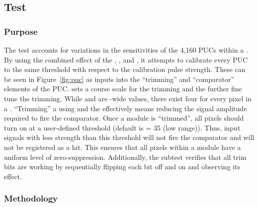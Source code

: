 
\newpage

\subsection{\trimming Test}
\label{ss:trimming}

\subsubsection{Purpose}

The \trimming test accounts for variations in the sensitivities of the 4,160 PUCs within a \roc.
By using the combined effect of the \vthrcomp, \vtrim, and \trimbits,
it attempts to calibrate every PUC to the same threshold with respect to the calibration pulse strength.
These \dacs can be seen in Figure~\ref{fig:puc} as inputs into the ``trimming'' and ``comparator'' elements of the PUC.
\vtrim sets a course scale for the trimming and the \trimbits further fine tune the trimming.
While \vthrcomp and \vtrim are \roc-wide values, there exist four \trimbits for every pixel in a \roc.
``Trimming'' a \roc using \vtrim and the \trimbits effectively means reducing the signal amplitude required to fire the comparator.
Once a module is ``trimmed'', all pixels should turn on at a user-defined threshold (default is \vcal = 35 (low range)).
Thus, input signals with less strength than this threshold will not fire the comparator and will not be registered as a hit.
This ensures that all pixels within a module have a uniform level of zero-suppression.
Additionally, the \trimbit subtest verifies that all trim bits are working
by sequentially flipping each bit off and on and observing its effect.

\subsubsection{Methodology}

